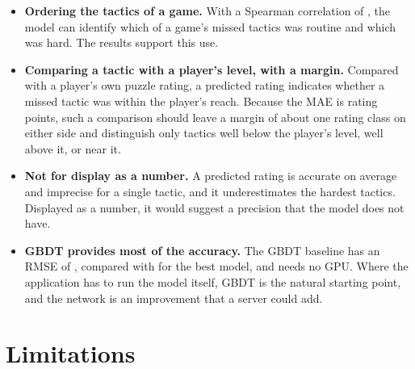 \documentclass[11pt]{article}
\begin{document}
\begin{itemize}
\item \textbf{Ordering the tactics of a game.} With a Spearman correlation
of , the model can identify which of a game's missed
tactics was routine and which was hard. The results support this use.
\item \textbf{Comparing a tactic with a player's level, with a margin.}
Compared with a player's own puzzle rating, a predicted rating indicates
whether a missed tactic was within the player's reach. Because the MAE is
 rating points, such a comparison should leave a margin of about
one rating class on either side and distinguish only tactics well below the
player's level, well above it, or near it.
\item \textbf{Not for display as a number.} A predicted rating is accurate on
average and imprecise for a single tactic, and it underestimates the hardest
tactics. Displayed as a number, it would suggest a precision that the model
does not have.
\item \textbf{GBDT provides most of the accuracy.} The GBDT baseline has an
RMSE of , compared with  for the best
model, and needs no GPU. Where the application has to run the model itself,
GBDT is the natural starting point, and the network is an improvement that a
server could add.
\end{itemize}

\section{Limitations}
\label{sec:limits}
\end{document}
